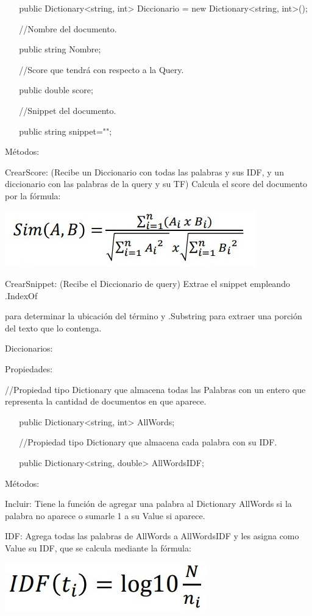 \documentclass[
]{article}
\begin{document}
~ ~ public Dictionary\textless string, int\textgreater{} Diccionario =
new Dictionary\textless string, int\textgreater();

~ ~ //Nombre del documento.

~ ~ public string Nombre;

~ ~ //Score que tendrá con respecto a la Query.

~ ~ public double score;

~ ~ //Snippet del documento.

~ ~ public string snippet="";

Métodos:

CrearScore: (Recibe un Diccionario con todas las palabras y sus IDF, y
un diccionario con las palabras de la query y su TF) Calcula el score
del documento por la fórmula:

\includegraphics[width=4.28125in,height=0.95833in]{media/image2.png}

CrearSnippet: (Recibe el Diccionario de query) Extrae el snippet
empleando .IndexOf

para determinar la ubicación del término y .Substring para extraer una
porción del texto que lo contenga.

Diccionarios:

Propiedades:

//Propiedad tipo Dictionary que almacena todas las Palabras con un
entero que representa la cantidad de documentos en que aparece.

~ ~ public Dictionary\textless string, int\textgreater{} AllWords;

~ ~ //Propiedad tipo Dictionary que almacena cada palabra con su IDF.

~ ~ public Dictionary\textless string, double\textgreater{} AllWordsIDF;

Métodos:

Incluir: Tiene la función de agregar una palabra al Dictionary AllWords
si la palabra no aparece o sumarle 1 a su Value si aparece.

IDF: Agrega todas las palabras de AllWords a AllWordsIDF y les asigna
como Value su IDF, que se calcula mediante la fórmula:

\includegraphics[width=3.4375in,height=0.82292in]{media/image3.png}
\end{document}

